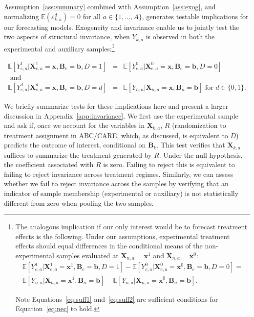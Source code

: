 Assumption~\ref{ass:summary} combined with Assumption~\ref{ass:exog}, and normalizing $\mathbb{E}(\varepsilon^d_{k,a})=0$ for all $a \in \{1,\dots,\bar{A}\}$, generates testable implications for our forecasting models. Exogeneity and invariance enable us to jointly test the two aspects of structural invariance, when $Y_{k,a}$ is observed in both the experimental and auxiliary samples:\footnote{The analogous implication if our only interest would be to forecast treatment effects is the following. Under our assumptions, experimental treatment effects should equal differences in the conditional means of the non-experimental samples evaluated at $\bm{X}_{n,a} = \bm{x}^1$ and  $\bm{X}_{n,a} = \bm{x}^0$:
\begin{eqnarray}
\mathbb{E} \left[ Y_{e,a}^1 |  \bm{X}_{e,a}^1 = \bm{x}^1, \bm{B}_e = \bm{b}, D = 1 \right] - \mathbb{E} \left[ Y_{e,a}^0 |  \bm{X}_{e,a}^0 = \bm{x}^0, \bm{B}_e = \bm{b}, D = 0 \right] = \nonumber \\
\mathbb{E} \left[ Y_{n,a} | \bm{X}_{n,a} = \bm{x}^1, \bm{B}_n = \bm{b} \right] - \mathbb{E} \left[ Y_{n,a} | \bm{X}_{n,a} = \bm{x}^0, \bm{B}_n = \bm{b} \right]. \label{eq:nec}
\end{eqnarray}

Note Equations~\eqref{eq:suff1} and~\eqref{eq:suff2} are sufficient conditions for Equation~\eqref{eq:nec} to hold.}

\begin{eqnarray}
\mathbb{E} \left[ Y_{e,a}^1 | \bm{X}_{e,a}^1 = \bm{x}, \bm{B}_{e} = \bm{b}, D = 1   \right] &=&  \mathbb{E} \left[ Y_{e,a}^0 | \bm{X}_{e,a}^0 = \bm{x}, \bm{B}_{e} = \bm{b}, D = 0   \right] \label{eq:suff1}  \\
\text{ and} & \nonumber \\
\mathbb{E} \left[ Y_{e,a}^d | \bm{X}_{e,a}^d = \bm{x}, \bm{B}_{e} = \bm{b}, D = d   \right] &=&  \mathbb{E} \left[ Y_{n,a} | \bm{X}_{n,a} = \bm{x}, \bm{B}_{n} = \bm{b} \right] \text{ for }  d \in \{0,1\}. \label{eq:suff2}
\end{eqnarray}

We briefly summarize tests for these implications here and present a larger discussion in Appendix~\ref{app:invariance}. We first use the experimental sample and ask if, once we account for the variables in $\bm{X}_{k,a}$, $R$ (randomization to treatment assignment in ABC/CARE, which, as discussed, is equivalent to $D$) predicts the outcome of interest, conditional on $\bm{B}_k$. This test verifies that $\bm{X}_{k,a}$ suffices to summarize the treatment generated by $R$. Under the null hypothesis, the coefficient associated with $R$ is zero. Failing to reject this is equivalent to failing to reject invariance across treatment regimes. Similarly, we can assess whether we fail to reject invariance across the samples by verifying that an indicator of sample membership (experimental or auxiliary) is not statistically different from zero when pooling the two samples.


